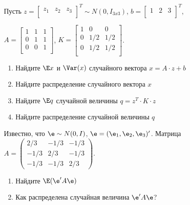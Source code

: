 \documentclass[pdftex,11pt,openany]{book}\usepackage[]{graphicx}\usepackage[]{color}
\begin{document}
\begin{solution}
\end{solution}


\begin{problem}
Пусть $z =  \begin{bmatrix}
z_1 & z_2 & z_3\\
\end{bmatrix} ^T \sim N(0, I_{3x3})$, $b =  \begin{bmatrix}
1 & 2 & 3\\
\end{bmatrix} ^T$,

$A =  \begin{bmatrix}
1 & 1 & 1 \\
0 & 1 & 1 \\
0 & 0 & 1 \\
\end{bmatrix} $, $K =  \begin{bmatrix}
1 & 0 & 0 \\
0 & 1/2 & 1/2 \\
0 & 1/2 & 1/2 \\
\end{bmatrix} $.

\begin{enumerate}
\item Найдите $\E x$ и $\Var (x)$ случайного вектора $x = A \cdot z + b$
\item Найдите распределение случайного вектора $x$
\item Найдите $\E q$ случайной величины $q = z^T \cdot K \cdot z$
\item Найдите распределение случайной величины $q$
\end{enumerate}
\end{problem}

\begin{solution}
\end{solution}


\begin{problem}
Известно, что $\e\sim N(0,I)$, $\e=(\e_1,\e_2,\e_3)'$. Матрица $A=\left(\begin{matrix}
2/3 & -1/3 & -1/3 \\ 
-1/3 & 2/3 & -1/3 \\ 
-1/3 & -1/3 & 2/3
\end{matrix}\right)$.
\begin{enumerate}
\item Найдите $\E(\e'A\e)$
\item Как распределена случайная величина $\e' A\e$?
\end{enumerate}
\end{problem}
\end{document}
